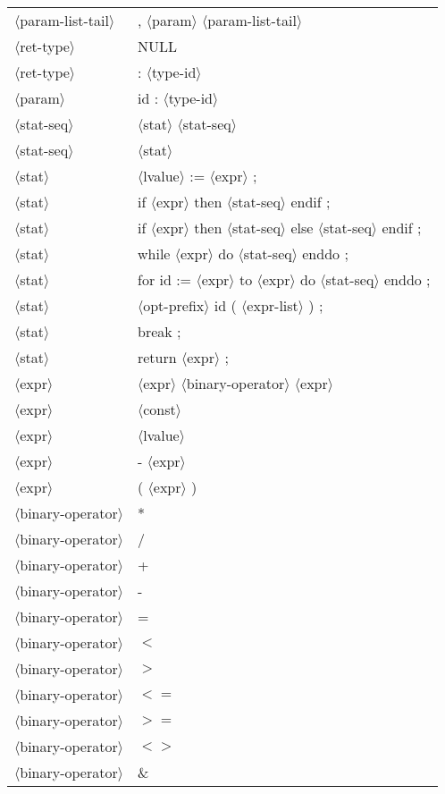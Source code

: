 \documentclass[11pt, fleqn]{article}
\newcommand{\atag}[1]{$\langle$#1$\rangle$}
\begin{document}
\begin{longtable}{l|l}
\atag{param-list-tail}			&	, \atag{param} \atag{param-list-tail}		\\
\atag{ret-type}					&	NULL		\\
\atag{ret-type}					&	: \atag{type-id}		\\
\atag{param}						&	id : \atag{type-id}		\\
\atag{stat-seq}					&	\atag{stat} \atag{stat-seq}		\\
\atag{stat-seq}					&	\atag{stat}		\\
\atag{stat}						&	\atag{lvalue} := \atag{expr}	;	\\
\atag{stat}						&	if \atag{expr} then \atag{stat-seq} endif ;		\\
\atag{stat}						&	if \atag{expr} then \atag{stat-seq} else \atag{stat-seq} endif ;		\\
\atag{stat}						&	while \atag{expr} do \atag{stat-seq} enddo ;		\\
\atag{stat}						&	for id := \atag{expr} to \atag{expr} do \atag{stat-seq} enddo ;		\\
\atag{stat}						&	\atag{opt-prefix} id ( \atag{expr-list} ) ; \\
\atag{stat}						&	break ;		\\
\atag{stat}						&	return \atag{expr} ;		\\
\atag{expr}						&	\atag{expr} \atag{binary-operator} \atag{expr}		\\
\atag{expr}						&	\atag{const}		\\
\atag{expr}						&	\atag{lvalue}		\\
\atag{expr}						&	- \atag{expr}		\\
\atag{expr}						&	( \atag{expr} )		\\
\atag{binary-operator}			&	*	\\
\atag{binary-operator}			&	/	\\
\atag{binary-operator}			&	+	\\
\atag{binary-operator}			&	-	\\
\atag{binary-operator}			&	=	\\
\atag{binary-operator}			&	$<$	\\
\atag{binary-operator}			&	$>$	\\
\atag{binary-operator}			&	$<=$	\\
\atag{binary-operator}			&	$>=$	\\
\atag{binary-operator}			&	$<>$	\\
\atag{binary-operator}			&	\&	\\

\end{longtable}
\end{document}
